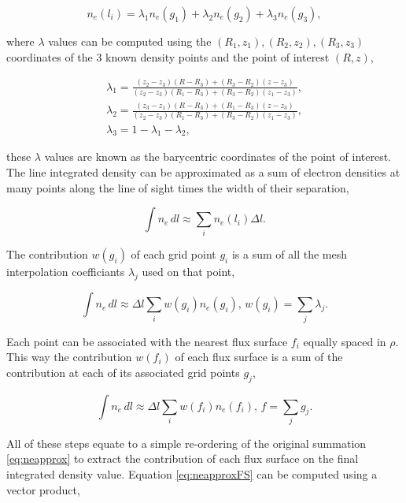 \begin{equation}
  n_e(l_i) = \lambda_1 n_e(g_1) + \lambda_2 n_e(g_2) + \lambda_3 n_e(g_3),
\end{equation}

\noindent where $\lambda$ values can be computed using the $(R_1,z_1), (R_2,z_2), (R_3,z_3)$ coordinates of the 3 known density points and the point of interest $(R, z)$,

\begin{gather}
\lambda_1 = \frac{(z_2 - z_3)(R - R_3) + (R_3 - R_2)(z - z_3)}{(z_2 - z_3)(R_1 - R_3) + (R_3 - R_2)(z_1 - z_3)},\\
\lambda_2 = \frac{(z_3 - z_1)(R - R_3) + (R_1 - R_3)(z - z_3)}{(z_2 - z_3)(R_1 - R_3) + (R_3 - R_2)(z_1 - z_3)},\\
\lambda_3 = 1-\lambda_1-\lambda_2,
\end{gather}

\noindent these $\lambda$ values are known as the barycentric coordinates of the point of interest. The line integrated density can be approximated as a sum of electron densities at many points along the line of sight times the width of their separation,

\begin{equation}
  \int n_e \, dl \approx \sum_i n_e(l_i) \Delta l.
  \label{eq:neapprox}
\end{equation}

\noindent The contribution $w(g_i)$ of each grid point $g_i$ is a sum of all the mesh interpolation coefficiants $\lambda_j$ used on that point,

\begin{equation}
  \int n_e \, dl \approx \Delta l \sum_i w(g_i) n_e(g_i), \, w(g_i) = \sum_j \lambda_j.
\end{equation}

\noindent Each point can be associated with the nearest flux surface $f_i$ equally spaced in $\rho$. This way the contribution $w(f_i)$ of each flux surface is a sum of the contribution at each of its associated grid points $g_j$,

\begin{equation}
  \int n_e \, dl \approx \Delta l \sum_i w(f_i) n_e(f_i), \, f = \sum_j g_j.
  \label{eq:neapproxFS}
\end{equation}

\noindent All of these steps equate to a simple re-ordering of the original summation \ref{eq:neapprox} to extract the contribution of each flux surface on the final integrated density value. Equation \ref{eq:neapproxFS} can be computed using a vector product,

